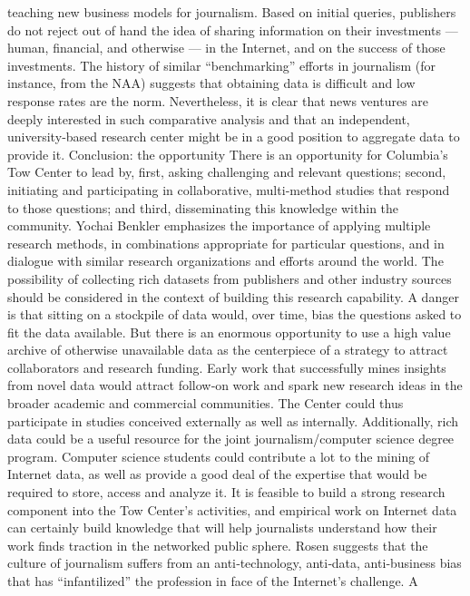 teaching new business models for journalism. Based on initial queries,
publishers do not reject out of hand the idea of sharing information on
their investments — human, financial, and otherwise — in the Internet,
and on the success of those investments. The history of similar
``benchmarking'' efforts in journalism (for instance, from the NAA)
suggests that obtaining data is difficult and low response rates are the
norm. Nevertheless, it is clear that news ventures are deeply interested in
such comparative analysis and that an independent, university‐based
research center might be in a good position to aggregate data to provide it.
Conclusion: the opportunity
There is an opportunity for Columbia’s Tow Center to lead by, first,
asking challenging and relevant questions; second, initiating and
participating in collaborative, multi‐method studies that respond to those
questions; and third, disseminating this knowledge within the
community. Yochai Benkler emphasizes the importance of applying
multiple research methods, in combinations appropriate for particular
questions, and in dialogue with similar research organizations and efforts
around the world.
The possibility of collecting rich datasets from publishers and other
industry sources should be considered in the context of building this
research capability. A danger is that sitting on a stockpile of data would,
over time, bias the questions asked to fit the data available. But there is an
enormous opportunity to use a high value archive of otherwise
unavailable data as the centerpiece of a strategy to attract collaborators
and research funding. Early work that successfully mines insights from
novel data would attract follow‐on work and spark new research ideas in
the broader academic and commercial communities. The Center could
thus participate in studies conceived externally as well as internally.
Additionally, rich data could be a useful resource for the joint
journalism/computer science degree program. Computer science students
could contribute a lot to the mining of Internet data, as well as provide a
good deal of the expertise that would be required to store, access and
analyze it.
It is feasible to build a strong research component into the Tow Center’s
activities, and empirical work on Internet data can certainly build
knowledge that will help journalists understand how their work finds
traction in the networked public sphere. Rosen suggests that the culture of
journalism suffers from an anti‐technology, anti‐data, anti‐business bias
that has ``infantilized'' the profession in face of the Internet’s challenge. A
